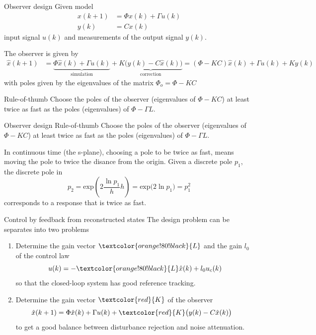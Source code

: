 \documentclass[presentation,aspectratio=1610]{beamer}
\begin{document}
\begin{frame}[label={sec:org23f8645}]{Observer design}
Given model
 \begin{equation*}
 \begin{split}
  x(k+1) &= \Phi x(k) + \Gamma u(k)\\
  y(k) &= C x(k)
 \end{split}
 \label{eq:ssmodel}
\end{equation*}
input signal \(u(k)\) and measurements of the output signal \(y(k)\). 

\pause
The observer is given by
\begin{equation*}
\begin{split}
\hat{x}(k+1) &= \underbrace{\Phi \hat{x}(k) + \Gamma u(k)}_{\text{simulation}} + \underbrace{K\big(y(k) - C\hat{x}(k)\big)}_{\text{correction}} = \left(\Phi - KC\right)\hat{x}(k) +  \Gamma u(k) + Ky(k)
\end{split}
\end{equation*}
with poles given by the eigenvalues of the matrix \(\Phi_o = \Phi - KC\)

\pause

\alert{Rule-of-thumb} Choose the poles of the observer (eigenvalues of \(\Phi-KC\)) at least twice as fast as the poles (eigenvalues) of \(\Phi-\Gamma L\).
\end{frame}

\begin{frame}[label={sec:org121c645}]{Observer design}
\alert{Rule-of-thumb} Choose the poles of the observer (eigenvalues of \(\Phi-KC\)) at least twice as fast as the poles (eigenvalues) of \(\Phi-\Gamma L\).

In continuous time (the s-plane), choosing a pole to be twice as fast, means moving the pole to twice the disance from the origin. Given a discrete pole \(p_1\), the discrete pole in 
\[ p_2 = \text{exp}\left( 2 \frac{\ln p_1}{h} h\right) = \text{exp} \big( 2 \ln p_1 \big) = p_1^2\]
corresponds to a response that is twice as fast.
\end{frame}

\begin{frame}[label={sec:orgce8f2cc}]{Control by feedback from reconstructed states}
The design problem can be separates into two problems
\begin{enumerate}
\item Determine the gain vector \(\textcolor{orange!80!black}{L}\) and the gain \(l_0\) of the control law
\[ u(k) = -\textcolor{orange!80!black}{L} \hat{x}(k) + l_0 u_c(k)\]
so that the closed-loop system has good reference tracking.
\item Determine the gain vector \(\textcolor{red}{K}\) of the observer
\begin{equation*}
\begin{split}
\hat{x}(k+1) &= \Phi \hat{x}(k) + \Gamma u(k) + \textcolor{red}{K} \big(y(k) - C\hat{x}(k)\big)
\end{split}
\end{equation*}
to get a good balance between disturbance rejection and noise attenuation.
\end{enumerate}
\end{frame}
\end{document}
